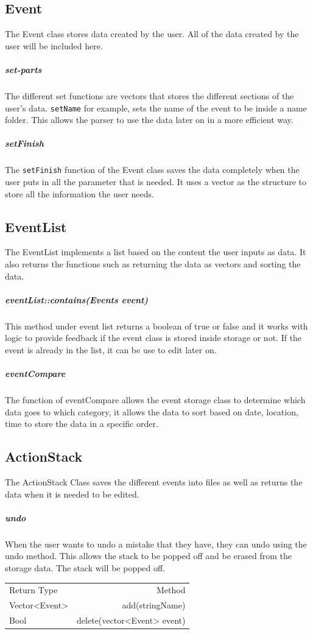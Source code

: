 \documentclass[12pt]{extarticle}
\begin{document}
\subsection{Event}	 					
The Event class stores data created by the user. All of the data created by the user will be included here.
\subparagraph{set-parts}
The different set functions are vectors that stores the different sections of the user's data. \texttt{setName} for example, sets the name of the event to be inside a name folder. This allows the parser to use the data later on in a more efficient way.
\subparagraph{setFinish}
The \texttt{setFinish} function of the Event class saves the data completely when the user puts in all the parameter that is needed. It uses a vector as the structure to store all the information the user needs. 
\subsection{EventList}
The EventList implements a list based on the content the user inputs as data. It also returns the functions such as returning the data as vectors and sorting the data.
\subparagraph{eventList::contains(Events event)}
This method under event list returns a boolean of true or false and it works with logic to provide feedback if the event class is stored inside storage or not. If the event is already in the list, it can be use to edit later on.
\subparagraph{eventCompare}
The function of eventCompare allows the event storage class to determine which data goes to which category, it allows the data to sort based on date, location, time to store the data in a specific order.
\subsection{ActionStack}
The ActionStack Class saves the different events into files as well as returns the data when it is needed to be edited.
\subparagraph{undo}
When the user wants to undo a mistake that they have, they can undo using the undo method. This allows the stack to be popped off and be erased from the storage data. The stack will be popped off.


\begin{center}
\begin{tabular}{|l|r|}
Return Type                     & Method                                         \\
Vector<Event>                   & add(stringName)                                \\
Bool                            & delete(vector<Event> event)
\end{tabular}
\end{center}
\end{document}
